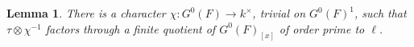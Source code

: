 \documentclass[reqno]{amsart}
\numberwithin{equation}{subsection}
\newcommand{\F}{\mathbf{F}}
\newcommand{\Q}{\mathbf{Q}}
\newcommand{\Z}{\mathbf{Z}}
\newcommand{\Gal}{\operatorname{Gal}}
\newcommand{\ol}[1]{\overline{#1}}
\newcommand{\co}{\colon}
\DeclareMathOperator{\rk}{rk}
\newtheorem{lemma}[thm]{Lemma}
\theoremstyle{remark}
\numberwithin{equation}{subsection}
\numberwithin{figure}{subsection}
\begin{document}



\begin{lemma}\label{lemma:depth-zero-twisting-character}
There is a character $\chi\co G^0(F)\to k^\times$, trivial on $G^0(F)^1$, such that $\tau \otimes \chi^{-1}$ factors through a finite quotient of $G^0(F)_{[x]}$ of order prime to $\ell$.
\end{lemma}
\end{document}
